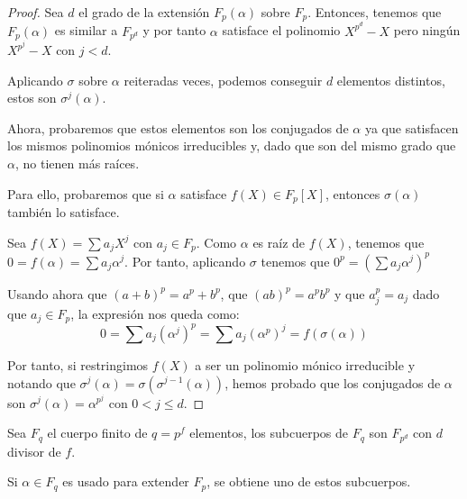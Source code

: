 \begin{proof}
	Sea $d$ el grado de la extensión $F_p(\alpha)$ sobre $F_p$. Entonces, tenemos que $F_p(\alpha)$ es similar a $F_{p^d}$ y por tanto $\alpha$ satisface el polinomio $X^{p^d} - X$ pero ningún $X^{p^j} - X$ con $j < d$.
	
	Aplicando $\sigma$ sobre $\alpha$ reiteradas veces, podemos conseguir $d$ elementos distintos, estos son $\sigma^j(\alpha)$.
	
	Ahora, probaremos que estos elementos son los conjugados de $\alpha$ ya que satisfacen los mismos polinomios mónicos irreducibles y, dado que son del mismo grado que $\alpha$, no tienen más raíces.
	
	Para ello, probaremos que si $\alpha$ satisface $f(X) \in F_p[X]$, entonces $\sigma(\alpha)$ también lo satisface.
	
	Sea $f(X) = \sum a_j X^j$ con $a_j \in F_p$. Como $\alpha$ es raíz de $f(X)$, tenemos que $ 0 = f(\alpha) = \sum a_j \alpha^j$. Por tanto, aplicando $\sigma$ tenemos que $0^p = \left(\sum a_j \alpha^j\right)^p$
	
	Usando ahora que $(a+b)^p = a^p + b^p$, que $(ab)^p = a^p b^p$ y que $a_j^p = a_j$ dado que $a_j \in F_p$, la expresión nos queda como:
	$$0 = \sum a_j \left(\alpha^j\right)^p = \sum a_j \left(\alpha^p\right)^j = f(\sigma(\alpha))$$
	
	Por tanto, si restringimos $f(X)$ a ser un polinomio mónico irreducible y notando que $\sigma^j(\alpha) = \sigma(\sigma^{j-1}(\alpha))$, hemos probado que los conjugados de $\alpha$ son $\sigma^j(\alpha) = \alpha^{p^j}$ con $ 0 < j \leq d$.
\end{proof}

\begin{thm}
	Sea $F_q$ el cuerpo finito de $q = p^f$ elementos, los subcuerpos de $F_q$ son $F_{p^d}$ con $d$ divisor de $f$.
	
	Si $\alpha \in F_q$ es usado para extender $F_p$, se obtiene uno de estos subcuerpos.
\end{thm}

